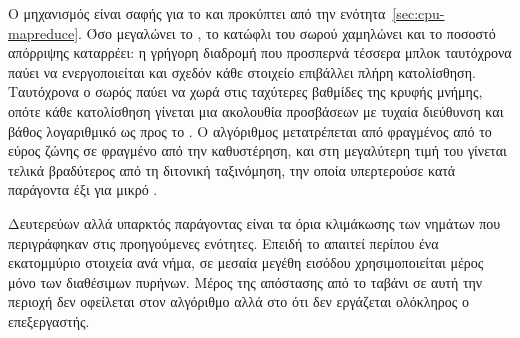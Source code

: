 Ο μηχανισμός είναι σαφής για το  και προκύπτει από την
ενότητα~\ref{sec:cpu-mapreduce}. Όσο μεγαλώνει το , το κατώφλι του σωρού
χαμηλώνει και το ποσοστό απόρριψης καταρρέει: η γρήγορη διαδρομή που προσπερνά
τέσσερα μπλοκ ταυτόχρονα παύει να ενεργοποιείται και σχεδόν κάθε στοιχείο
επιβάλλει πλήρη κατολίσθηση. Ταυτόχρονα ο σωρός παύει να χωρά στις ταχύτερες
βαθμίδες της κρυφής μνήμης, οπότε κάθε κατολίσθηση γίνεται μια ακολουθία
προσβάσεων με τυχαία διεύθυνση και βάθος λογαριθμικό ως προς το . Ο
αλγόριθμος μετατρέπεται από φραγμένος από το εύρος ζώνης σε φραγμένο από την
καθυστέρηση, και στη μεγαλύτερη τιμή του  γίνεται τελικά βραδύτερος από τη
διτονική ταξινόμηση, την οποία υπερτερούσε κατά παράγοντα έξι για μικρό .

Δευτερεύων αλλά υπαρκτός παράγοντας είναι τα όρια κλιμάκωσης των νημάτων που
περιγράφηκαν στις προηγούμενες ενότητες. Επειδή το  απαιτεί
περίπου ένα εκατομμύριο στοιχεία ανά νήμα, σε μεσαία μεγέθη εισόδου
χρησιμοποιείται μέρος μόνο των διαθέσιμων πυρήνων. Μέρος της απόστασης από το
ταβάνι σε αυτή την περιοχή δεν οφείλεται στον αλγόριθμο αλλά στο ότι δεν
εργάζεται ολόκληρος ο επεξεργαστής.
